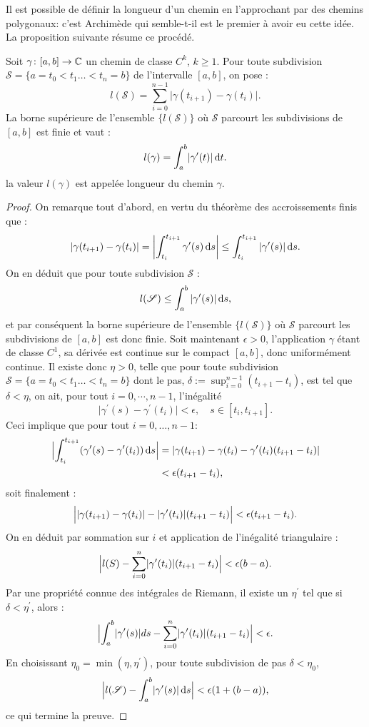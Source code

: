 Il est possible de définir la longueur d'un chemin en l'approchant par des chemins polygonaux: c'est Archimède qui semble-t-il est le premier à avoir eu cette idée. La proposition suivante résume ce procédé.
\begin{fprop}
Soit $\gamma \colon [a,b] \to \mathbb{C}$ un chemin de classe $C^k$, $k \geq 1$. Pour toute subdivision $\mathcal{S} = \{a=t_0 < t_1 \dots < t_n = b\}$ de l'intervalle $[a,b]$, on pose :
\[
l(\mathcal{S}) = \sum_{i=0}^{n-1} \lvert \gamma(t_{i+1}) - \gamma(t_i) \rvert.
\]
La borne supérieure de l'ensemble $\{l(\mathcal{S})\}$ où $\mathcal{S}$ parcourt les subdivisions de $[a,b]$ est finie et vaut :
\[
l(\gamma) = \int_a^b \lvert\gamma^\prime(t)\rvert \mathop{}\mathopen{}\mathrm{d} t.
\]
la valeur $l(\gamma)$ est appelée longueur du chemin $\gamma$.
\end{fprop}
\begin{proof}
On remarque tout d'abord, en vertu du théorème des accroissements finis que :
\[
\lvert \gamma(t_{i+1}) - \gamma(t_i) \rvert  = \left\lvert \int_{t_i}^{t_{i+1}} \gamma^\prime(s) \mathop{}\mathopen{}\mathrm{d} s \right\rvert \leq \int_{t_i}^{t_{i+1}}\left\lvert \gamma^\prime(s) \right\rvert\mathop{}\mathopen{}\mathrm{d} s .\]
On en déduit que pour toute subdivision $\mathcal{S}$ :
\[
l(\mathcal{S}) \leq  \int_a^b \left\lvert \gamma^\prime(s) \right\rvert \mathop{}\mathopen{}\mathrm{d} s,\]
et par conséquent la borne supérieure de l'ensemble $\{l(\mathcal{S})\}$ où $\mathcal{S}$ parcourt les subdivisions de $[a,b]$ est donc finie. Soit maintenant $\epsilon > 0$, l'application $\gamma$ étant de classe $C^1$, sa dérivée est continue sur le compact $[a,b]$, donc uniformément continue. Il existe donc $\eta>0$, telle que pour toute subdivision $\mathcal{S} = \{a=t_0 < t_1 \dots < t_n = b\}$  dont le pas, $\delta :=\sup_{i=0}^{n-1}(t_{i+1}-t_i)$, est tel que $\delta<\eta$, on ait, pour tout $i=0, \cdots, n-1$, l'inégalité 
\[
\lvert \gamma^\prime(s) - \gamma^\prime(t_i)\rvert < \epsilon, \quad s \in [t_i, t_{i+1}].
\]
Ceci implique que pour tout $i=0,\dots,n-1$:
\begin{align*}
\Bigl \lvert\int_{t_i}^{t_{i+1}} (\gamma^\prime(s) - \gamma^\prime(t_i)) \mathop{}\mathopen{}\mathrm{d} s \Bigr \rvert & = \lvert \gamma(t_{i+1}) - \gamma(t_i) - \gamma^\prime(t_i) (t_{i+1}- t_i) \rvert \\& < \epsilon (t_{i+1}-t_i),
\end{align*}
soit finalement :
\[
\Bigl \lvert \lvert\gamma(t_{i+1}) - \gamma(t_i)\rvert -  \lvert\gamma^\prime(t_i) \rvert(t_{i+1}-t_i)\Bigr \rvert < \epsilon (t_{i+1}-t_i).
\]
On en déduit par sommation sur $i$ et application de l'inégalité triangulaire :
\[
\Bigl \lvert l(S) - \sum_{i=0}^n  \lvert\gamma^\prime(t_i) \rvert(t_{i+1}-t_i)\Bigr \rvert < \epsilon (b-a).
\]
Par une propriété connue des intégrales de Riemann, il existe un $\eta^\prime$ tel que si $\delta< \eta^\prime$, alors :  
\[
\Bigl  \lvert \int_a^b \lvert\gamma^\prime(s)\rvert ds -  \sum_{i=0}^n  \lvert\gamma^\prime(t_i) \rvert(t_{i+1}-t_i) \Bigr \rvert  < \epsilon .\]
En choisissant $\eta_0=\min (\eta, \eta^\prime)$, pour toute subdivision de pas $\delta<\eta_0$, 
\[ \Bigl \lvert l(\mathcal{S}) - \int_a^b \lvert\gamma^\prime(s)\rvert \mathop{}\mathopen{}\mathrm{d} s \Bigr \rvert < \epsilon(1 + (b-a)),\]
ce qui termine la preuve.
\end{proof}
